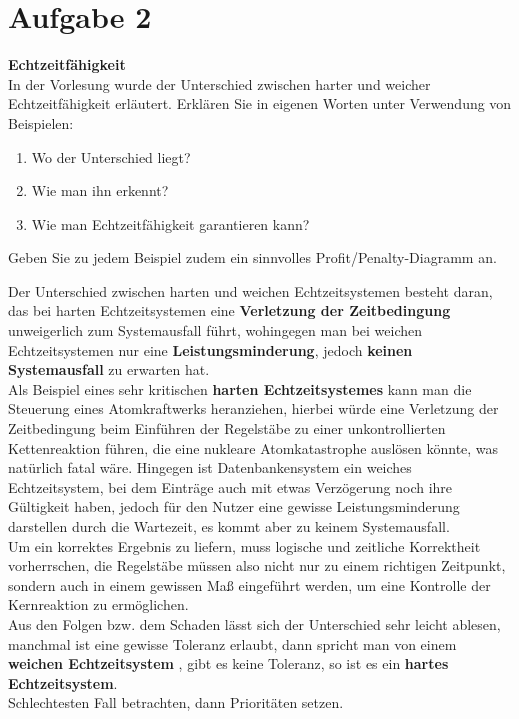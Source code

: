 \documentclass[12pt,a4paper,ngerman]{article}
\begin{document}
\section{Aufgabe 2}
\begin{framed}
\textbf{Echtzeitfähigkeit}\\
In der Vorlesung wurde der Unterschied zwischen harter und weicher Echtzeitfähigkeit erläutert. Erklären Sie in eigenen Worten unter Verwendung von Beispielen:
\begin{enumerate}
\item Wo der Unterschied liegt?
\item Wie man ihn erkennt?
\item Wie man Echtzeitfähigkeit garantieren kann?
\end{enumerate}
Geben Sie zu jedem Beispiel zudem ein sinnvolles Profit/Penalty-Diagramm an.
\end{framed}
Der Unterschied zwischen harten und weichen Echtzeitsystemen besteht daran, das bei harten Echtzeitsystemen eine \textbf{Verletzung der Zeitbedingung} unweigerlich zum Systemausfall führt, wohingegen man bei weichen Echtzeitsystemen nur eine \textbf{Leistungsminderung}, jedoch \textbf{keinen Systemausfall} zu erwarten hat. \\
Als Beispiel eines sehr kritischen \textbf{harten Echtzeitsystemes} kann man die Steuerung eines Atomkraftwerks heranziehen, hierbei würde eine Verletzung der Zeitbedingung beim Einführen der Regelstäbe zu einer unkontrollierten Kettenreaktion führen, die eine nukleare Atomkatastrophe auslösen könnte, was natürlich fatal wäre. Hingegen ist Datenbankensystem ein weiches Echtzeitsystem, bei dem Einträge auch mit etwas Verzögerung noch ihre Gültigkeit haben, jedoch für den Nutzer eine gewisse Leistungsminderung darstellen durch die Wartezeit, es kommt aber zu keinem Systemausfall. \\
Um ein korrektes Ergebnis zu liefern, muss logische und zeitliche Korrektheit vorherrschen, die Regelstäbe müssen also nicht nur zu einem richtigen Zeitpunkt, sondern auch in einem gewissen Maß eingeführt werden, um eine Kontrolle der Kernreaktion zu ermöglichen. \\
Aus den Folgen bzw. dem Schaden lässt sich der Unterschied sehr leicht ablesen, manchmal ist eine gewisse Toleranz erlaubt, dann spricht man von einem \textbf{weichen Echtzeitsystem} , gibt es keine Toleranz, so ist es ein \textbf{hartes Echtzeitsystem}. \\
Schlechtesten Fall betrachten, dann Prioritäten setzen. 
\end{document}
